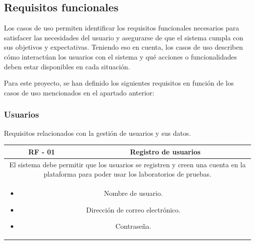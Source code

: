             \newpage
        
        \subsection{Requisitos funcionales}
            \label{sec:requisitos-funcionales}
            
            Los casos de uso permiten identificar los requisitos funcionales necesarios para satisfacer las necesidades del usuario y asegurarse de que el sistema cumpla con sus objetivos y expectativas. Teniendo eso en cuenta, los casos de uso describen cómo interactúan los usuarios con el sistema y qué acciones o funcionalidades deben estar disponibles en cada situación.
            
            Para este proyecto, se han definido los siguientes requisitos en función de los casos de uso mencionados en el apartado anterior:
            
            \subsubsection{Usuarios}
            
                Requisitos relacionados con la gestión de usuarios y sus datos.
                
                \begin{table}[!htbp]
                    \centering

                    \begin{tabular}{|c|c|}
                        \hline
                        \textbf{RF - 01} & \textbf{Registro de usuarios} \\
                        \hline
                        \multicolumn{2}{|p{15cm}|}{
                            El sistema debe permitir que los usuarios se registren y creen una cuenta en la plataforma para poder usar los laboratorios de pruebas.
                        } \\
                        \hline
                        \multicolumn{2}{|p{15cm}|}{
                            \begin{itemize}
                                \item Nombre de usuario.
                                \item Dirección de correo electrónico.
                                \item Contraseña.
                            \end{itemize}
                            } \\
                        \hline
                    \end{tabular}

                    \label{tab:RF01}
                \end{table}
                
